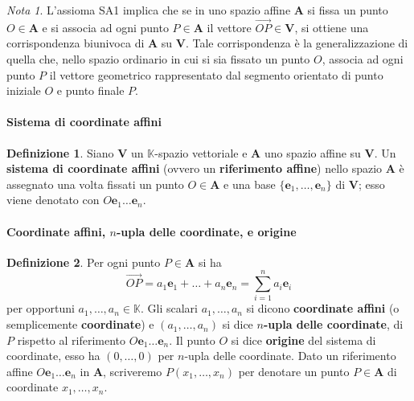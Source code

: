 \documentclass{article}
\theoremstyle{plain}
\theoremstyle{definition}
\newtheorem{defn}{Definizione}[section]
\theoremstyle{remark}
\newtheorem{note}{Nota}
\begin{document}
\vspace{10pt}

\begin{note}
    L'assioma SA1 implica che se in uno spazio affine $\mathbf{A}$ si fissa un punto $O\in\mathbf{A}$ e si associa ad ogni punto $P\in\mathbf{A}$ il vettore $\overrightarrow{OP}\in\mathbf{V}$,
    si ottiene una corrispondenza biunivoca di $\mathbf{A}$ su $\mathbf{V}$. 
    Tale corrispondenza è la generalizzazione di quella che, nello spazio ordinario in cui si sia fissato un punto $O$, associa ad ogni punto $P$ il vettore 
    geometrico rappresentato dal segmento orientato di punto iniziale $O$ e punto finale $P$.
\end{note}

\vspace{10pt}

\paragraph{Sistema di coordinate affini}
\begin{bxthm}
\begin{defn}
    Siano $\mathbf{V}$ un $\mathbb{K}$-spazio vettoriale e $\mathbf{A}$ uno spazio affine su $\mathbf{V}$. 
    Un \textbf{sistema di coordinate affini} (ovvero un \textbf{riferimento affine}) nello spazio $\mathbf{A}$ 
    è assegnato una volta fissati un punto $O\in\mathbf{A}$ e una base $\{\mathbf{e}_1,\dots,\mathbf{e}_n\}$ di $\mathbf{V}$;
    esso viene denotato con $O\mathbf{e}_1\dots\mathbf{e}_n$.
\end{defn}
\end{bxthm}

\vspace{10pt}

\paragraph{Coordinate affini, $n$-upla delle coordinate, e origine}
\begin{bxthm}
\begin{defn}
    Per ogni punto $P\in\mathbf{A}$ si ha 
    \[\overrightarrow{OP}=a_1\mathbf{e}_1+\dots+a_n\mathbf{e}_n=\sum_{i=1}^{n}a_i\mathbf{e}_i\]
    per opportuni $a_1,\dots,a_n\in\mathbb{K}$.
    Gli scalari $a_1,\dots,a_n$ si dicono \textbf{coordinate affini} (o semplicemente \textbf{coordinate}) e $(a_1,\dots,a_n)$ si dice $n$\textbf{-upla delle coordinate},
    di $P$ rispetto al riferimento $O\mathbf{e}_1\dots\mathbf{e}_n$. Il punto $O$ si dice \textbf{origine} del sistema di coordinate, esso ha $(0,\dots,0)$ per $n$-upla delle coordinate.
    Dato un riferimento affine $O\mathbf{e}_1\dots\mathbf{e}_n$ in $\mathbf{A}$, scriveremo $P(x_1,\dots,x_n)$ per denotare un punto $P\in\mathbf{A}$ di coordinate $x_1,\dots,x_n$.
\end{defn}
\end{bxthm}
\end{document}
